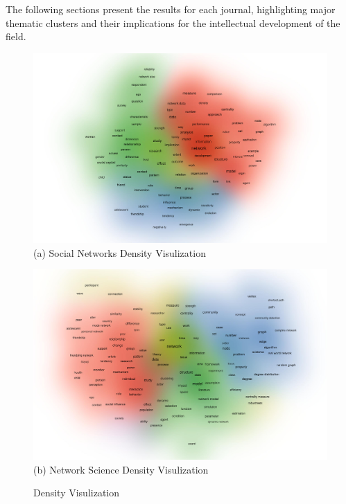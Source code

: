 \documentclass[twocolumn]{article}
\begin{document}
		The following sections present the results for each journal, highlighting major thematic clusters and their implications for the intellectual development of the field.
		
		\begin{figure}
			\centering
			\caption{\label{fig.fig11}Density Visulization}
			\begin{minipage}[b]{0.32\textwidth}
				\centering
				\includegraphics[width=\linewidth]{Social Networks/VOS/co-word.pdf}
				(a) Social Networks Density Visulization
			\end{minipage}
			\begin{minipage}[b]{0.32\textwidth}
				\centering
				\includegraphics[width=\linewidth]{Network Science/VOS/co-word.pdf}
				(b) Network Science Density Visulization
			\end{minipage}
			\begin{minipage}[b]{0.32\textwidth}
				\centering

\end{minipage}
\end{figure}
\end{document}
